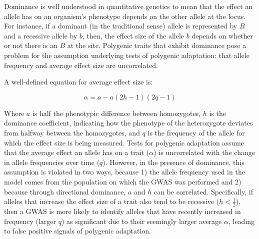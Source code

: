 \documentclass[a4paper,10pt]{article}
\begin{document}
\begin{comment}
  Ok, this is getting close, but I think there are still a couple things to unwind here.
  The second equation below is not really a feature of tests of polygenic adaptation, but rather is just a fact about the way that the average effect size depends on the difference between homozygotes, dominance, and the current allele frequency in the population. Above, you've already motivated the fact that tests of polygenic adaptation assume independence of the average effect and patterns of change in allele frequency. Now I think before you get to equation 2 you want to introduce the idea of dominance (you haven't done that up to this point), i.e. when the effect of an allele on a phentoype depends on the identity of the other allele at that site, and then you can say that the presence of dominance violates this assumption of independence between allele frequency and average effect. Then show the equation and explain what the individual pieces are.
  \end{comment}


Dominance is well understood in quantitative genetics to mean that the
effect an allele has on an organism's phenotype depends on the other
allele at the locus. For instance, if a dominant (in the traditional
sense) allele is represented by $B$ and a recessive allele by $b$,
then, the effect size of the allele $b$ depends on whether or not
there is an $B$ at the site. Polygenic traits that exhibit dominance
pose a problem for the assumption underlying tests of polygenic
adaptation: that allele frequency and average effect size
are uncorrelated. 

A well-defined equation for average effect size is: 

\begin{equation}
  \alpha = a - a(2h - 1)(2q - 1)
\end{equation}

Where $a$ is half the phenotypic difference between homozygotes, $h$ is the
dominance coefficient, indicating how the phenotype of the heterozygote deviates from halfway between the homozygotes, and $q$ is the frequency of the allele for which
the effect size is being measured. Tests for polygenic adaptation
assume that the average effect an allele has on a trait ($\alpha$) is
uncorrelated with the change in allele frequencies over time
($q$). However, in the presence of dominance, this assumption is violated in two ways, because 1)
the allele frequency used in the model comes from the population on
which the GWAS was performed and 2) because through directional
dominance, $a$ and $h$ can be correlated. Specifically, if alleles that
increase the effect size of a trait also tend to be recessive
($h<\frac{1}{2}$), then a GWAS is more likely to identify alleles that have
recently increased in frequency (larger $q$) as significant due to
their seemingly larger average $\alpha$, leading to false
positive signals of polygenic adaptation.
\end{document}
